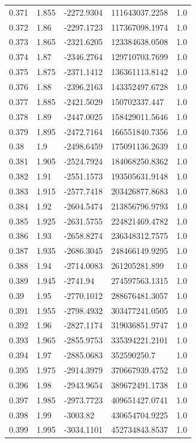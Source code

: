 \begin{tabular}{lllll}
0.371 & 1.855 & -2272.9304 & 111643037.2258 & 1.0 \\
0.372 & 1.86 & -2297.1723 & 117367098.1974 & 1.0 \\
0.373 & 1.865 & -2321.6205 & 123384638.0508 & 1.0 \\
0.374 & 1.87 & -2346.2764 & 129710703.7699 & 1.0 \\
0.375 & 1.875 & -2371.1412 & 136361113.8142 & 1.0 \\
0.376 & 1.88 & -2396.2163 & 143352497.6728 & 1.0 \\
0.377 & 1.885 & -2421.5029 & 150702337.447 & 1.0 \\
0.378 & 1.89 & -2447.0025 & 158429011.5646 & 1.0 \\
0.379 & 1.895 & -2472.7164 & 166551840.7356 & 1.0 \\
0.38 & 1.9 & -2498.6459 & 175091136.2639 & 1.0 \\
0.381 & 1.905 & -2524.7924 & 184068250.8362 & 1.0 \\
0.382 & 1.91 & -2551.1573 & 193505631.9148 & 1.0 \\
0.383 & 1.915 & -2577.7418 & 203426877.8683 & 1.0 \\
0.384 & 1.92 & -2604.5474 & 213856796.9793 & 1.0 \\
0.385 & 1.925 & -2631.5755 & 224821469.4782 & 1.0 \\
0.386 & 1.93 & -2658.8274 & 236348312.7575 & 1.0 \\
0.387 & 1.935 & -2686.3045 & 248466149.9295 & 1.0 \\
0.388 & 1.94 & -2714.0083 & 261205281.899 & 1.0 \\
0.389 & 1.945 & -2741.94 & 274597563.1315 & 1.0 \\
0.39 & 1.95 & -2770.1012 & 288676481.3057 & 1.0 \\
0.391 & 1.955 & -2798.4932 & 303477241.0505 & 1.0 \\
0.392 & 1.96 & -2827.1174 & 319036851.9747 & 1.0 \\
0.393 & 1.965 & -2855.9753 & 335394221.2101 & 1.0 \\
0.394 & 1.97 & -2885.0683 & 352590250.7 & 1.0 \\
0.395 & 1.975 & -2914.3979 & 370667939.4752 & 1.0 \\
0.396 & 1.98 & -2943.9654 & 389672491.1738 & 1.0 \\
0.397 & 1.985 & -2973.7723 & 409651427.0741 & 1.0 \\
0.398 & 1.99 & -3003.82 & 430654704.9225 & 1.0 \\
0.399 & 1.995 & -3034.1101 & 452734843.8537 & 1.0 \\

\end{tabular}
